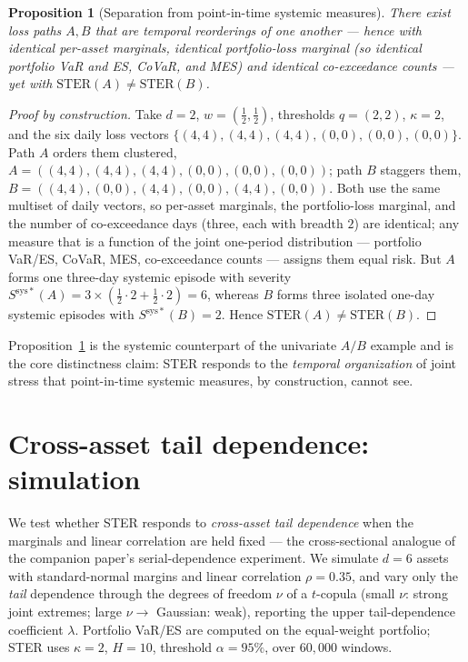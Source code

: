 \documentclass[11pt]{article}
\newtheorem{proposition}{Proposition}
\newcommand{\STER}{\mathrm{STER}}
\begin{document}
\begin{proposition}[Separation from point-in-time systemic measures]\label{prop:sep}
There exist loss paths $A,B$ that are temporal reorderings of one another --- hence with identical per-asset
marginals, identical portfolio-loss marginal (so identical portfolio VaR and ES, CoVaR, and MES) and
identical co-exceedance counts --- yet with $\STER(A)\neq\STER(B)$.
\end{proposition}
\begin{proof}[Proof by construction]
Take $d=2$, $w=(\tfrac12,\tfrac12)$, thresholds $q=(2,2)$, $\kappa=2$, and the six daily loss vectors
$\{(4,4),(4,4),(4,4),(0,0),(0,0),(0,0)\}$. Path $A$ orders them clustered,
$A=((4,4),(4,4),(4,4),(0,0),(0,0),(0,0))$; path $B$ staggers them,
$B=((4,4),(0,0),(4,4),(0,0),(4,4),(0,0))$. Both use the same multiset of daily vectors, so per-asset
marginals, the portfolio-loss marginal, and the number of co-exceedance days (three, each with breadth $2$)
are identical; any measure that is a function of the joint one-period distribution --- portfolio VaR/ES,
CoVaR, MES, co-exceedance counts --- assigns them equal risk. But $A$ forms one three-day systemic episode
with severity $S^{\mathrm{sys}*}(A)=3\times(\tfrac12\cdot2+\tfrac12\cdot2)=6$, whereas $B$ forms three
isolated one-day systemic episodes with $S^{\mathrm{sys}*}(B)=2$. Hence $\STER(A)\neq\STER(B)$.
\end{proof}
\noindent Proposition~\ref{prop:sep} is the systemic counterpart of the univariate $A/B$ example and is the
core distinctness claim: STER responds to the \emph{temporal organization} of joint stress that point-in-time
systemic measures, by construction, cannot see.

\section{Cross-asset tail dependence: simulation}
We test whether STER responds to \emph{cross-asset tail dependence} when the marginals and linear
correlation are held fixed --- the cross-sectional analogue of the companion paper's serial-dependence
experiment. We simulate $d=6$ assets with standard-normal margins and linear correlation $\rho=0.35$, and
vary only the \emph{tail} dependence through the degrees of freedom $\nu$ of a $t$-copula (small $\nu$: strong
joint extremes; large $\nu\to$ Gaussian: weak), reporting the upper tail-dependence coefficient $\lambda$.
Portfolio VaR/ES are computed on the equal-weight portfolio; STER uses $\kappa=2$, $H=10$, threshold
$\alpha=95\%$, over $60{,}000$ windows.
\end{document}
